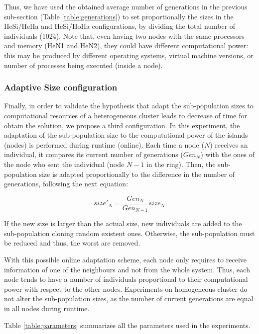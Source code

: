 \documentclass[final,1p,times]{elsarticle}
\begin{document}
Thus, we have used the obtained average number of generations in the previous sub-section (Table \ref{table:generations}) to set proportionally the sizes in the HeSi/HeHa and HeSi/HoHa configurations, by dividing the total number of individuals (1024). Note that, even having two nodes with the same processors and memory (HeN1 and HeN2), they could have different computational power: this may be produced by different operating systems, virtual machine versions, or number of processes being executed (inside a node).



\subsubsection{Adaptive Size configuration}



Finally, in order to validate the hypothesis that adapt the sub-population sizes to computational resources of a heterogeneous cluster leads to decrease of time for obtain the solution, we propose a third configuration. In this experiment, the adaptation of the sub-population size to the computational power of the islands (nodes) is performed during runtime (online).  Each time a node ($N$) receives an individual, it compares its current number of generations ($Gen_{N}$) with the ones of the node who sent the individual (node $N-1$ in the ring). Then, the sub-population size is adapted proportionally to the difference in the number of generations, following the next equation:

\begin{equation}
size'_{N}=\dfrac{Gen_{N}}{Gen_{N-1}}size_{N}
\end{equation}

If the new size is larger than the actual size, new individuals are added to the sub-population cloning random existent ones. Otherwise, the sub-population must be reduced and thus, the worst are removed.

With this possible online adaptation scheme, each node only requires to receive information of one of the neighbours and not from the whole system. Thus, each node tends to have a number of individuals proportional to their computational power with respect to the other nodes. Experiments on homogeneous cluster do not alter the sub-population sizes, as the number of current generations are equal in all nodes during runtime.

Table \ref{table:parameters} summarizes all the parameters used in the experiments.
\end{document}
